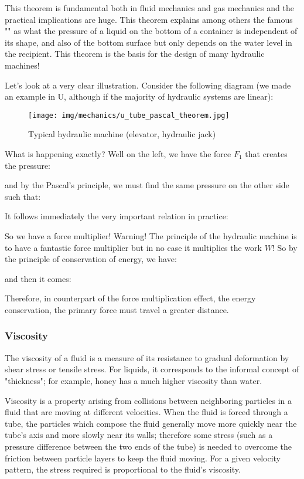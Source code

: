 	This theorem is fundamental both in fluid mechanics and gas  mechanics and the practical implications are huge. This theorem explains among others the famous "" as what the pressure of a liquid on the bottom of a container is independent of its shape, and also of the bottom surface but only depends on the water level in the recipient. This theorem is the basis for the design of many hydraulic machines!

	Let's look at a very clear illustration. Consider the following diagram (we made an example in U, although if the majority of hydraulic systems are linear):
	\begin{figure}[H]
		\centering
		\texttt{[image: img/mechanics/u\_tube\_pascal\_theorem.jpg]}
		\caption[]{Typical hydraulic machine (elevator, hydraulic jack)}
	\end{figure}
	What is happening exactly? Well on the left, we have the force $F_1$ that creates the pressure:
	
	and by the Pascal's principle, we must find the same pressure on the other side such that:
	
	It follows immediately the very important relation in practice:
	
	So we have a force multiplier! Warning! The principle of the hydraulic machine is to have a fantastic force multiplier but in no case it multiplies the work $W$! So by the principle of conservation of energy, we have:
	
	and then it comes:
	
	Therefore, in counterpart of the force multiplication effect, the energy conservation, the primary force must travel a greater distance.
	
	\subsubsection{Viscosity}
	The viscosity of a fluid is a measure of its resistance to gradual deformation by shear stress or tensile stress. For liquids, it corresponds to the informal concept of "thickness"; for example, honey has a much higher viscosity than water.

	Viscosity is a property arising from collisions between neighboring particles in a fluid that are moving at different velocities. When the fluid is forced through a tube, the particles which compose the fluid generally move more quickly near the tube's axis and more slowly near its walls; therefore some stress (such as a pressure difference between the two ends of the tube) is needed to overcome the friction between particle layers to keep the fluid moving. For a given velocity pattern, the stress required is proportional to the fluid's viscosity.

